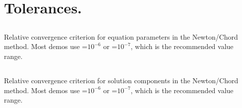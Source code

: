 \section{ Tolerances.} \label{sec:Tolerances}
\subsection{}  \label{sec:EPSL}


 Relative convergence criterion for equation parameters in the Newton/Chord 
 method. Most demos use =$10^{-6}$ or =$10^{-7}$,
 which is the recommended value range.

\subsection{}  \label{sec:EPSU}


 Relative convergence criterion for solution components in the Newton/Chord 
 method. Most demos use =$10^{-6}$ or =$10^{-7}$,
 which is the recommended value range.

\subsection{}  \label{sec:EPSS}


